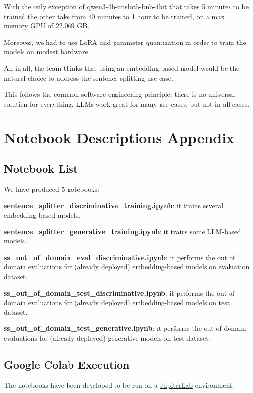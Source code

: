 \documentclass[11pt]{article}
\begin{document}
With the only exception of qwen3-4b-unsloth-bnb-4bit that takes 5 minutes
to be trained the other take from 40 minutes to 1 hour to be trained,
on a max memory GPU of 22.069 GB.

Moreover, we had to use LoRA and parameter quantization in order to train the models on modest hardware.

All in all, the team thinks that using an embedding-based model would be the natural choice to address the sentence splitting use case.

This follows the common software engineering principle: there is no universal solution for everything. LLMs work great for many use cases, but not in all cases.

\appendix

\section{Notebook Descriptions Appendix}
\label{sec:appendix1}

\subsection{Notebook  List}

We have produced 5 notebooks:

\noindent \textbf{sentence\_splitter\_discriminative\_training.ipynb}: it trains several embedding-based
	models.
    
\noindent  \textbf{sentence\_splitter\_generative\_training.ipynb}: it trains some LLM-based models.

\noindent \textbf{ss\_out\_of\_domain\_eval\_discriminative.ipynb}: it performs the out of domain evaluations for (already deployed) embedding-based models on evaluation dataset.
    
\noindent \textbf{ss\_out\_of\_domain\_test\_discriminative.ipynb}: it performs the out of domain evaluations for (already deployed) embedding-based models on test dataset.

\noindent \textbf{ss\_out\_of\_domain\_test\_generative.ipynb}: it performs the out of domain evaluations for (already deployed) generative models on test dataset.

\subsection{Google Colab Execution}

The notebooks have been developed to be run on a \href{https://jupyterlab.readthedocs.io/en/latest/#}{JupiterLab}
environment. 
\end{document}
